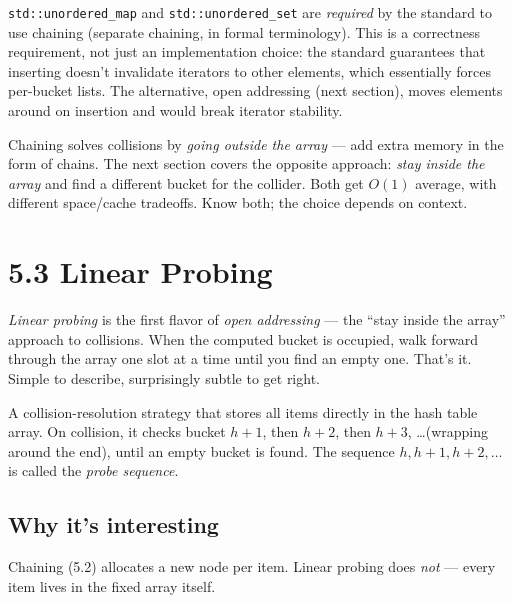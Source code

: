 \documentclass[11pt]{article}
\begin{document}
\begin{notebox}
\texttt{std::unordered\_map} and \texttt{std::unordered\_set} are
\emph{required} by the standard to use chaining (separate
chaining, in formal terminology). This is a correctness
requirement, not just an implementation choice: the standard
guarantees that inserting doesn't invalidate iterators to other
elements, which essentially forces per-bucket lists. The
alternative, open addressing (next section), moves elements
around on insertion and would break iterator stability.
\end{notebox}

\begin{ideabox}
Chaining solves collisions by \emph{going outside the array} ---
add extra memory in the form of chains. The next section covers
the opposite approach: \emph{stay inside the array} and find a
different bucket for the collider. Both get $O(1)$ average, with
different space/cache tradeoffs. Know both; the choice depends
on context.
\end{ideabox}

\section{5.3 Linear Probing}

\emph{Linear probing} is the first flavor of \emph{open
addressing} --- the ``stay inside the array'' approach to
collisions. When the computed bucket is occupied, walk forward
through the array one slot at a time until you find an empty
one. That's it. Simple to describe, surprisingly subtle to get
right.

\begin{defnbox}
A collision-resolution strategy that stores all items directly in
the hash table array. On collision, it checks bucket $h+1$, then
$h+2$, then $h+3$, \ldots (wrapping around the end), until an
empty bucket is found. The sequence $h, h+1, h+2, \ldots$ is
called the \emph{probe sequence}.
\end{defnbox}

\subsection*{Why it's interesting}

Chaining (5.2) allocates a new node per item. Linear probing does
\emph{not} --- every item lives in the fixed array itself.
\end{document}
